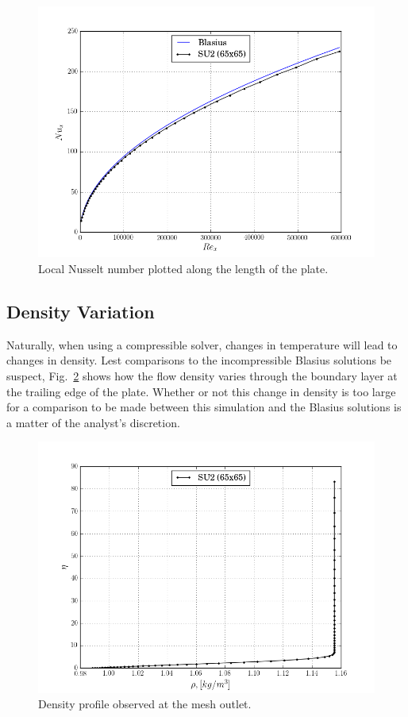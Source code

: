 \documentclass[12pt,letterpaper]{article}
\begin{document}
\begin{figure}[h] 
\centering
\includegraphics[width=\linewidth]{Nu_350.png}
\caption{Local Nusselt number plotted along the length of the plate.}
\label{fig:Nu}
\end{figure}

\subsection*{Density Variation}
Naturally, when using a compressible solver, changes in temperature will lead to changes in density. Lest comparisons to the incompressible Blasius solutions be suspect, Fig.~\ref{fig:rho} shows how the flow density varies through the boundary layer at the trailing edge of the plate. Whether or not this change in density is too large for a comparison to be made between this simulation and the Blasius solutions is a matter of the analyst's discretion.

\begin{figure}[h] 
\centering
\includegraphics[width=\linewidth]{rho_profile.png}
\caption{Density profile observed at the mesh outlet.}
\label{fig:rho}
\end{figure}
\end{document}
